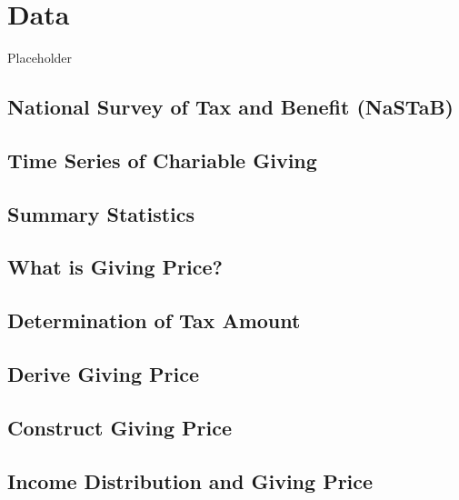 \documentclass[ review  , 3p ]{elsarticle}
\begin{document}
  \hypertarget{data}{%
  \section{Data}\label{data}}
  
  Placeholder
  
  \hypertarget{national-survey-of-tax-and-benefit-nastab}{%
  \subsection{National Survey of Tax and Benefit (NaSTaB)}\label{national-survey-of-tax-and-benefit-nastab}}
  
  \hypertarget{time-series-of-chariable-giving}{%
  \subsection{Time Series of Chariable Giving}\label{time-series-of-chariable-giving}}
  
  \hypertarget{summary-statistics}{%
  \subsection{Summary Statistics}\label{summary-statistics}}
  
  \hypertarget{what-is-giving-price}{%
  \subsection{What is Giving Price?}\label{what-is-giving-price}}
  
  \hypertarget{determination-of-tax-amount}{%
  \subsection{Determination of Tax Amount}\label{determination-of-tax-amount}}
  
  \hypertarget{derive-giving-price}{%
  \subsection{Derive Giving Price}\label{derive-giving-price}}
  
  \hypertarget{construct-giving-price}{%
  \subsection{Construct Giving Price}\label{construct-giving-price}}
  
  \hypertarget{income-distribution-and-giving-price}{%
  \subsection{Income Distribution and Giving Price}\label{income-distribution-and-giving-price}}
  
\end{document}
